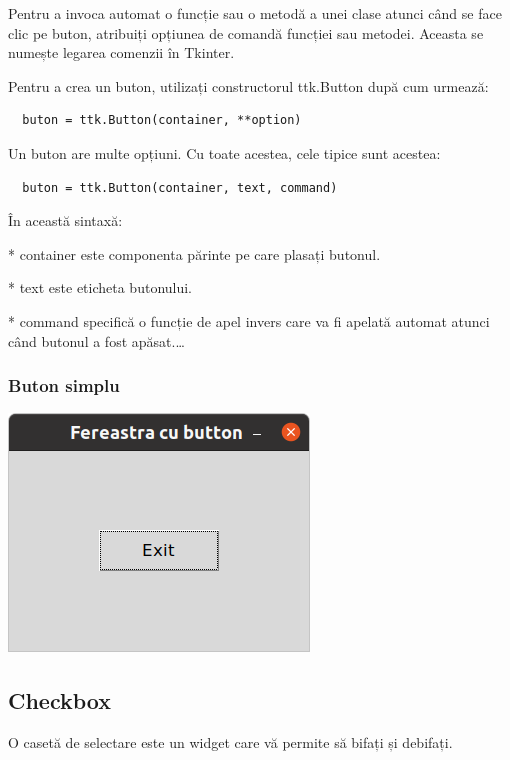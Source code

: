 \documentclass[12pt,a4paper]{book}
\begin{document}
Pentru a invoca automat o funcție sau o metodă a unei clase atunci când se face clic pe buton, atribuiți opțiunea de comandă funcției sau metodei.  Aceasta se numește legarea comenzii în Tkinter.

Pentru a crea un buton, utilizați constructorul ttk.Button după cum urmează:
\begin{verbatim}
  buton = ttk.Button(container, **option)
\end{verbatim}
Un buton are multe opțiuni.  Cu toate acestea, cele tipice sunt acestea:
\begin{verbatim}
  buton = ttk.Button(container, text, command)
\end{verbatim}
În această sintaxă:

     * container este componenta părinte pe care plasați butonul.
     
     * text este eticheta butonului.
     
     * command specifică o funcție de apel invers care va fi apelată automat atunci când butonul a fost apăsat.\ldots
\subsubsection{Buton simplu}

\includegraphics[width=\linewidth]{img03.png}

\subsection{Checkbox}
O casetă de selectare este un widget care vă permite să bifați și debifați.
\end{document}
